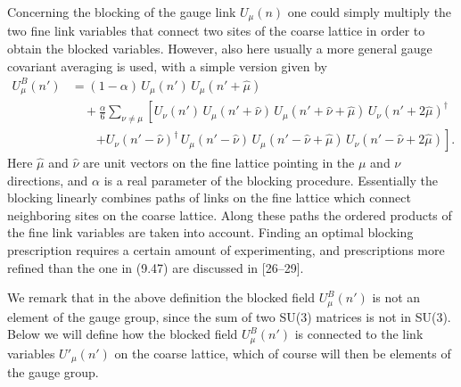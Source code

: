 Concerning the blocking of the gauge link $U_\mu(n)$ one could simply multiply
the two fine link variables that connect two sites of the coarse lattice in
order to obtain the blocked variables. However, also here usually a more
general gauge covariant averaging is used, with a simple version given by
\begin{align}
  U^B_\mu(n') &= (1-\alpha)\,U_\mu(n')\,U_\mu(n'+\hat\mu) \nonumber\\
    &\quad + \frac{\alpha}{6}\sum_{\nu\neq\mu}
      \left[U_\nu(n')\,U_\mu(n'+\hat\nu)\,U_\mu(n'+\hat\nu+\hat\mu)\,
       U_\nu(n'+2\hat\mu)^\dagger \right. \nonumber\\
    &\qquad \left. + U_\nu(n'-\hat\nu)^\dagger\,U_\mu(n'-\hat\nu)\,
       U_\mu(n'-\hat\nu+\hat\mu)\,U_\nu(n'-\hat\nu+2\hat\mu)\right] .
\end{align}
Here $\hat\mu$ and $\hat\nu$ are unit vectors on the fine lattice pointing in
the $\mu$ and $\nu$ directions, and $\alpha$ is a real parameter of the
blocking procedure. Essentially the blocking linearly combines paths of links
on the fine lattice which connect neighboring sites on the coarse lattice.
Along these paths the ordered products of the fine link variables are taken
into account. Finding an optimal blocking prescription requires a certain
amount of experimenting, and prescriptions more refined than the one in (9.47)
are discussed in [26--29].

We remark that in the above definition the blocked field $U^B_\mu(n')$ is not
an element of the gauge group, since the sum of two SU(3) matrices is not in
SU(3). Below we will define how the blocked field $U^B_\mu(n')$ is connected
to the link variables $U'_\mu(n')$ on the coarse lattice, which of course will
then be elements of the gauge group.

